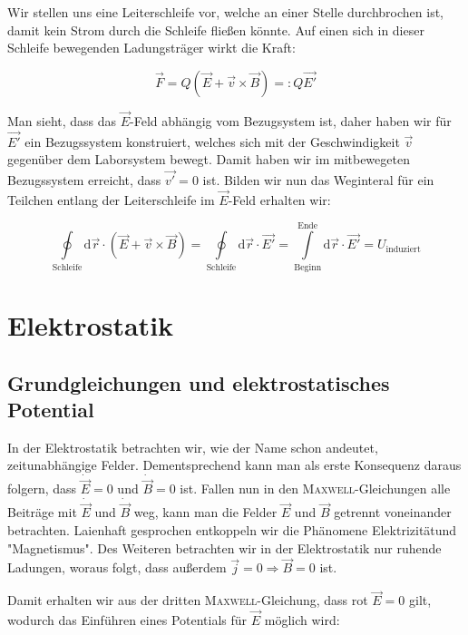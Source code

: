 Wir stellen uns eine Leiterschleife vor, welche an einer Stelle durchbrochen ist, damit kein Strom durch die Schleife fließen könnte. Auf einen sich in dieser Schleife bewegenden Ladungsträger wirkt die Kraft:

\begin{equation*}
\vec{F} = Q(\vec{E} + \vec{v}\times\vec{B}) =: Q\vec{E'}
\end{equation*} 

Man sieht, dass das $\vec{E}$-Feld abhängig vom Bezugsystem ist, daher haben wir für $\vec{E'}$ ein Bezugssystem konstruiert, welches sich mit der Geschwindigkeit $\vec{v}$ gegenüber dem Laborsystem bewegt. Damit haben wir im mitbewegeten Bezugssystem erreicht, dass $\vec{v'} = 0$ ist. Bilden wir nun das Weginteral für ein Teilchen entlang der Leiterschleife im $\vec{E}$-Feld erhalten wir:

\begin{equation*}
\oint\limits_{\mathrm{Schleife}}\mathrm{d}\vec{r}\cdot\left(\vec{E} + \vec{v}\times\vec{B}\right) = \oint\limits_{\mathrm{Schleife}}\mathrm{d}\vec{r}\cdot\vec{E'} = \int\limits_{\mathrm{Beginn}}^{\mathrm{Ende}}\mathrm{d}\vec{r}\cdot\vec{E'} = U_{\mathrm{induziert}}
\end{equation*}

\chapter{Elektrostatik}

\section{Grundgleichungen und elektrostatisches Potential}

In der Elektrostatik betrachten wir, wie der Name schon andeutet, zeitunabhängige Felder. Dementsprechend kann man als erste Konsequenz daraus folgern, dass $\dot{\vec{E}} = 0$ und $\dot{\vec{B}} = 0$ ist. Fallen nun in den \textsc{Maxwell}-Gleichungen alle Beiträge mit $\dot{\vec{E}}$ und $\dot{\vec{B}}$ weg, kann man die Felder $\vec{E}$ und $\vec{B}$ getrennt voneinander betrachten. Laienhaft gesprochen entkoppeln wir die Phänomene \grqq Elektrizität\grqq und "Magnetismus". Des Weiteren betrachten wir in der Elektrostatik nur ruhende Ladungen, woraus folgt, dass außerdem $\vec{j}=0 \Rightarrow \vec{B}=0$ ist.\

Damit erhalten wir aus der dritten \textsc{Maxwell}-Gleichung, dass rot $\vec{E} = 0$ gilt, wodurch das Einführen eines Potentials für $\vec{E}$ möglich wird:

